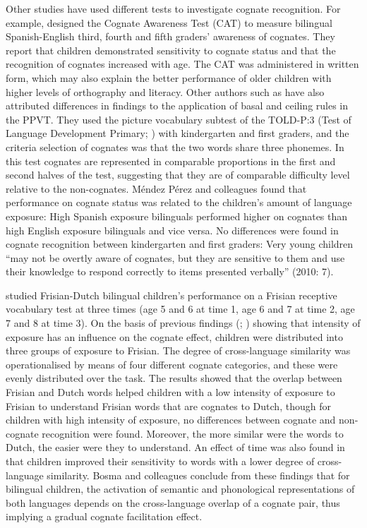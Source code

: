 \documentclass[output=paper,modfonts,nonflat,newtxmath]{langsci/langscibook}
\begin{document}
 {Other studies have used different tests to investigate cognate recognition. For example, \citet{MalabongaEtAl2008} designed the Cognate Awareness Test (CAT) to measure bilingual Spanish-English third, fourth and fifth graders’ awareness of cognates. They report that children demonstrated sensitivity to cognate status and that the recognition of cognates increased with age. The CAT was administered in written form, which may also explain the better performance of older children with higher levels of orthography and literacy. Other authors such as \citet{MendezPerezEtAl2010} have also attributed differences in findings to the application of basal and ceiling rules in the PPVT. They used the picture vocabulary subtest of the TOLD-P:3 (Test of Language Development Primary; \citealt{NewcomerHammill1997}) with kindergarten and first graders, and the criteria selection of cognates was that the two words share three phonemes. In this test cognates are represented in comparable proportions in the first and second halves of the test, suggesting that they are of comparable difficulty level relative to the non-cognates. Méndez Pérez and colleagues found that performance on cognate status was related to the children’s amount of language exposure: High Spanish exposure bilinguals performed higher on cognates than high English exposure bilinguals and vice versa. No differences were found in cognate recognition between kindergarten and first graders: Very young children “may not be overtly aware of cognates, but they are sensitive to them and use their knowledge to respond correctly to items presented verbally” (2010: 7).}{ }

 {\citet{BosmaEtAl2019} studied Frisian-Dutch bilingual children’s performance on a Frisian receptive vocabulary test at three times (age 5 and 6 at time 1, age 6 and 7 at time 2, age 7 and 8 at time 3). On the basis of previous findings (\citealt{MendezPerezEtAl2010}; \citealt{Dijkstra2013}) showing that intensity of exposure has an influence on the cognate effect, children were distributed into three groups of exposure to Frisian. The degree of cross-language similarity was operationalised by means of four different cognate categories, and these were evenly distributed over the task. The results showed that the overlap between Frisian and Dutch words helped children with a low intensity of exposure to Frisian to understand Frisian words that are cognates to Dutch, though for children with high intensity of exposure, no differences between cognate and non-cognate recognition were found. Moreover, the more similar were the words to Dutch, the easier were they to understand. An effect of time was also found in that children improved their sensitivity to words with a lower degree of cross-language similarity. Bosma and colleagues conclude from these findings that for bilingual children, the activation of semantic and phonological representations of both languages depends on the cross-language overlap of a cognate pair, thus implying a gradual cognate facilitation effect.}
\end{document}
